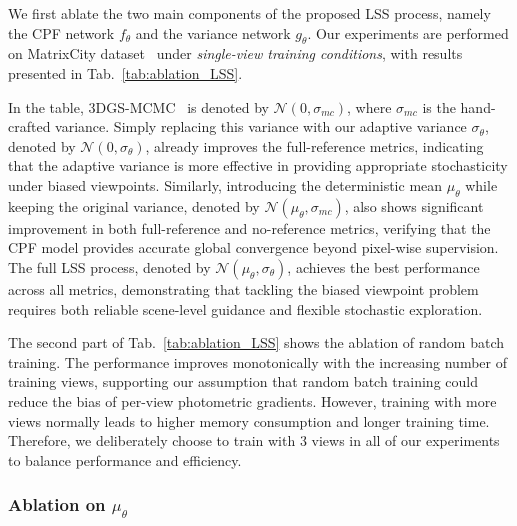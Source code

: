 \documentclass[lettersize,journal]{IEEEtran}
\begin{document}
We first ablate the two main components of the proposed LSS process, namely the CPF network $f_{\theta}$ and the variance network $g_{\theta}$.
Our experiments are performed on MatrixCity dataset~\cite{matrixcity} under \textit{single-view training conditions}, with results presented in Tab.~\ref{tab:ablation_LSS}.

In the table, 3DGS-MCMC~\cite{mcmc} is denoted by $\mathcal{N}(0, \sigma_{mc})$, where $\sigma_{mc}$ is the hand-crafted variance.  
Simply replacing this variance with our adaptive variance $\sigma_{\theta}$, denoted by $\mathcal{N}(0, \sigma_{\theta})$, already improves the full-reference metrics, indicating that the adaptive variance is more effective in providing appropriate stochasticity under biased viewpoints. Similarly, introducing the deterministic mean $\mu_{\theta}$ while keeping the original variance, denoted by $\mathcal{N}(\mu_{\theta}, \sigma_{mc})$, also shows significant improvement in both full-reference and no-reference metrics, verifying that the CPF model provides accurate global convergence beyond pixel-wise supervision.
The full LSS process, denoted by $\mathcal{N}(\mu_{\theta}, \sigma_{\theta})$, achieves the best performance across all metrics, demonstrating that tackling the biased viewpoint problem requires both reliable scene-level guidance and flexible stochastic exploration. 

The second part of Tab.~\ref{tab:ablation_LSS} shows the ablation of random batch training. The performance improves monotonically with the increasing number of training views, 
supporting our assumption that random batch training could reduce the bias of per-view photometric gradients.
However, training with more views normally leads to higher memory consumption and longer training time. Therefore, we deliberately choose to train with 3 views in all of our experiments to balance performance and efficiency.

\subsubsection{Ablation on $\mu_{\theta}$}
\end{document}
